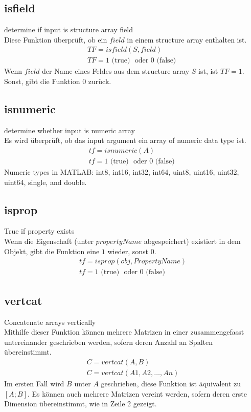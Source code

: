 \documentclass[12pt,bibstyle=none,pagenumberinfooter]{ifmdocument}
\begin{document}
	\subsection{isfield}
		\glqq determine if input is structure array field\grqq{}\\
		Diese Funktion \"uberpr\"uft, ob ein $field$ in einem \glqq structure array\grqq{} enthalten ist.
		\begin{gather*}
			TF = isfield(S,field)\\
			TF = 1 \text{ (true) } \text{ oder } 0 \text{ (false) }
		\end{gather*}
		Wenn $field$ der Name eines Feldes aus dem \glqq structure array\grqq{} $S$ ist, ist $TF=1$. Sonst, gibt die Funktion $0$ zur\"uck.
	\subsection{isnumeric}
		\glqq determine whether input is numeric array\grqq{}\\
		Es wird \"uberpr\"uft, ob das \glqq input argument\grqq{} ein \glqq array of numeric data type\grqq{} ist.
		\begin{gather*}
			tf = isnumeric(A)\\
			tf = 1 \text{ (true) } \text{ oder } 0 \text{ (false) }
		\end{gather*}
		Numeric types in MATLAB: int8, int16, int32, int64, uint8, uint16, uint32, uint64, single, and double.
	\subsection{isprop}
		\glqq True if property exists\grqq{}\\
		Wenn die Eigenschaft (unter $propertyName$ abgespeichert) existiert in dem Objekt, gibt die Funktion eine $1$ wieder, sonst $0$.
		\begin{gather*}
			tf = isprop(obj,PropertyName)\\
			tf = 1 \text{ (true) } \text{ oder } 0 \text{ (false) }
		\end{gather*}
	\subsection{vertcat}
		\glqq Concatenate arrays vertically\grqq{}\\
		Mithilfe dieser Funktion k\"onnen mehrere Matrizen in einer zusammengefasst untereinander geschrieben werden, sofern deren Anzahl an Spalten \"ubereinstimmt. 
		\begin{gather*}
			C = vertcat(A,B)\\
			C = vertcat(A1,A2,…,An)
		\end{gather*}
		Im ersten Fall wird $B$ unter $A$ geschrieben, diese Funktion ist \"aquivalent zu $[A ; B]$. Es k\"onnen auch mehrere Matrizen vereint werden, sofern deren erste Dimension \"ubereinstimmt, wie in Zeile 2 gezeigt.
\end{document}
